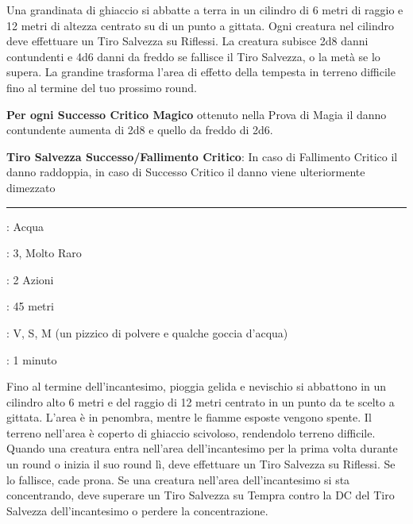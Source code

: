 \begin{multicols}{2}
Una grandinata di ghiaccio si abbatte a terra in un cilindro di 6 metri di raggio e 12 metri di altezza centrato su di un punto a gittata. Ogni creatura nel cilindro deve effettuare un Tiro Salvezza su Riflessi. La creatura subisce 2d8 danni contundenti e 4d6 danni da freddo se fallisce il Tiro Salvezza, o la metà se lo supera. La grandine trasforma l'area di effetto della tempesta in terreno difficile fino al termine del tuo prossimo round.

\textbf{Per ogni Successo Critico Magico} ottenuto nella Prova di Magia il danno contundente aumenta di 2d8 e quello da freddo di 2d6.

\textbf{Tiro Salvezza Successo/Fallimento Critico}: In caso di Fallimento Critico il danno raddoppia, in caso di Successo Critico il danno viene ulteriormente dimezzato

\smallskip\noindent\rule{\linewidth}{2pt} \hypertarget{Tempesta di Nevischio}{}\smallskip{}
\noindent
\begin{description}[noitemsep, topsep=0pt, parsep=0pt, partopsep=0pt, leftmargin=0cm, labelwidth=2.8cm]
	\item[\textbf{Lista di Magia}]: Acqua
	\item[\textbf{Livello}]: 3, Molto Raro
	\item[\textbf{T. di Lancio}]: 2 Azioni
	\item[\textbf{Gittata}]: 45 metri
	\item[\textbf{Componenti}]: V, S, M (un pizzico di polvere e qualche goccia d'acqua)
	\item[\textbf{Durata}]: 1 minuto
\end{description}

Fino al termine dell'incantesimo, pioggia gelida e nevischio si abbattono in un cilindro alto 6 metri e del raggio di 12 metri centrato in un punto da te scelto a gittata. L'area è in penombra, mentre le fiamme esposte vengono spente. Il terreno nell'area è coperto di ghiaccio scivoloso, rendendolo terreno difficile. Quando una creatura entra nell'area dell'incantesimo per la prima volta durante un round o inizia il suo round lì, deve effettuare un Tiro Salvezza su Riflessi. Se lo fallisce, cade prona. Se una creatura nell'area dell'incantesimo si sta concentrando, deve superare un Tiro Salvezza su Tempra contro la DC del Tiro Salvezza dell'incantesimo o perdere la concentrazione.


\end{multicols}
